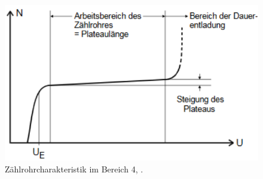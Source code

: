 \begin{figure}[H]
  \centering
  \includegraphics{ressources/Plateau.pdf}
  \caption{Zählrohrcharakteristik im Bereich 4, \cite{skript}.}
  \label{fig:Plateau}
\end{figure}


